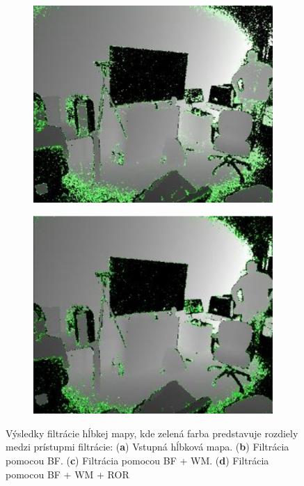 \begin{figure}[H]
	\hfill
	\begin{subfigure}[b]{0.24\textwidth}
		\centering
		\includegraphics[width=\textwidth]{figures/resers_p.png}
		\caption{}
		\label{fig:resers:p}
	\end{subfigure}
	\hfill
	\begin{subfigure}[b]{0.24\textwidth}
		\centering
		\includegraphics[width=\textwidth]{figures/resers_q.png}
		\caption{}
		\label{fig:resers:q}
	\end{subfigure}
	\caption{Výsledky filtrácie hĺbkej mapy, kde zelená farba predstavuje rozdiely medzi prístupmi filtrácie: (\textbf{a}) Vstupná hĺbková mapa. 
		(\textbf{b}) Filtrácia pomocou BF.
		(\textbf{c}) Filtrácia pomocou BF + WM.
		(\textbf{d}) Filtrácia pomocou BF + WM + ROR }
	\label{fig:resers:5}
\end{figure}


